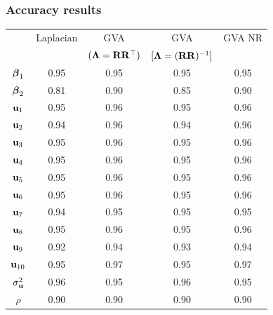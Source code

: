 \documentclass{beamer}
\begin{document}
\begin{frame}
	\frametitle{Accuracy results}
	\begin{tabular}{|c|cccc|}
		\hline
		               & Laplacian & GVA                    & GVA                         & GVA NR \\
		               &           & $({\boldsymbol \Lambda}={\bf R} {\bf R}^\top)$ & $[{\boldsymbol \Lambda}=({\bf R} {\bf R})^{-1}]$ &        \\
		\hline
		${\boldsymbol \beta}_1$     & 0.95      & 0.95                   & 0.95                        & 0.95   \\
		${\boldsymbol \beta}_2$     & 0.81      & 0.90                   & 0.85                        & 0.90   \\
		${\bf u}_1$        & 0.95      & 0.96                   & 0.95                        & 0.96   \\
		${\bf u}_2$        & 0.94      & 0.96                   & 0.94                        & 0.96   \\
		${\bf u}_3$        & 0.95      & 0.96                   & 0.95                        & 0.96   \\
		${\bf u}_4$        & 0.95      & 0.96                   & 0.95                        & 0.96   \\
		${\bf u}_5$        & 0.95      & 0.96                   & 0.95                        & 0.96   \\
		${\bf u}_6$        & 0.95      & 0.96                   & 0.95                        & 0.96   \\
		${\bf u}_7$        & 0.94      & 0.95                   & 0.95                        & 0.95   \\
		${\bf u}_8$        & 0.95      & 0.96                   & 0.95                        & 0.96   \\
		${\bf u}_9$        & 0.92      & 0.94                   & 0.93                        & 0.94   \\
		${\bf u}_{10}$     & 0.95      & 0.97                   & 0.95                        & 0.97   \\
		$\sigma_{\bf u}^2$ & 0.96      & 0.95                   & 0.96                        & 0.95   \\
		$\rho$         & 0.90      & 0.90                   & 0.90                        & 0.90   \\
		\hline
	\end{tabular}
\end{frame}
\end{document}
